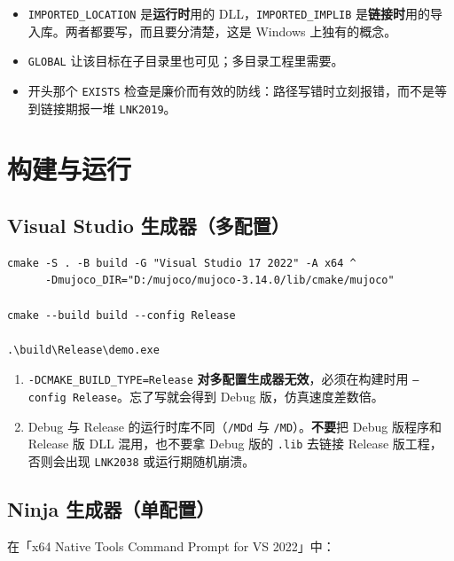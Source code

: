\begin{itemize}
	\item \texttt{IMPORTED\_LOCATION} 是\textbf{运行时}用的 DLL，\texttt{IMPORTED\_IMPLIB} 是\textbf{链接时}用的导入库。两者都要写，而且要分清楚，这是 Windows 上独有的概念。
	\item \texttt{GLOBAL} 让该目标在子目录里也可见；多目录工程里需要。
	\item 开头那个 \texttt{EXISTS} 检查是廉价而有效的防线：路径写错时立刻报错，而不是等到链接期报一堆 \texttt{LNK2019}。
\end{itemize}

\section{构建与运行}

\subsection{Visual Studio 生成器（多配置）}

\begin{lstlisting}[style=shell]
cmake -S . -B build -G "Visual Studio 17 2022" -A x64 ^
      -Dmujoco_DIR="D:/mujoco/mujoco-3.14.0/lib/cmake/mujoco"

cmake --build build --config Release

.\build\Release\demo.exe
\end{lstlisting}

\begin{warnbox}[多配置生成器的两个坑]
	\begin{enumerate}
		\item \texttt{-DCMAKE\_BUILD\_TYPE=Release} \textbf{对多配置生成器无效}，必须在构建时用 \texttt{--config Release}。忘了写就会得到 Debug 版，仿真速度差数倍。
		\item Debug 与 Release 的运行时库不同（\texttt{/MDd} 与 \texttt{/MD}）。\textbf{不要}把 Debug 版程序和 Release 版 DLL 混用，也不要拿 Debug 版的 \texttt{.lib} 去链接 Release 版工程，否则会出现 \texttt{LNK2038} 或运行期随机崩溃。
	\end{enumerate}
\end{warnbox}

\subsection{Ninja 生成器（单配置）}

在「x64 Native Tools Command Prompt for VS 2022」中：

